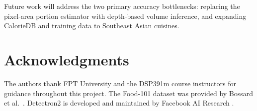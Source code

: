\documentclass[fleqn,10pt]{SelfArx}
\begin{document}
Future work will address the two primary accuracy bottlenecks: replacing the pixel-area portion estimator with depth-based volume inference, and expanding CalorieDB and training data to Southeast Asian cuisines.


\section*{Acknowledgments}

The authors thank FPT University and the DSP391m course instructors for guidance throughout this project. The Food-101 dataset was provided by Bossard et al.\ \cite{bossard2014food101}. Detectron2 is developed and maintained by Facebook AI Research \cite{wu2019detectron2}.


\printbibliography[heading=bibintoc]

\end{document}
